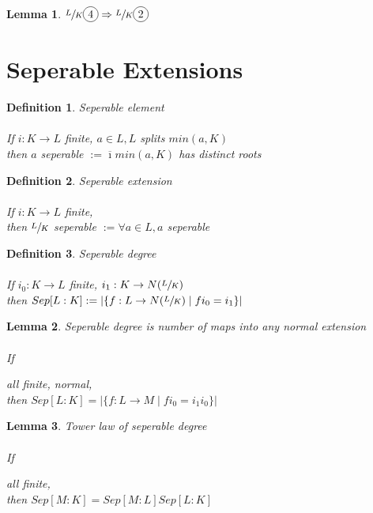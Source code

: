 \documentclass{article}
\theoremstyle{definitionstyle}
\newtheorem{defn}{Definition}[section]
\theoremstyle{lemmastyle}
\newtheorem{lem}{Lemma}[section]
\theoremstyle{remark}
\newcommand{\ibar}{\overline{\imath}}
\newcommand*\circled[1]{\tikz[baseline=(char.base)]{
            \node[shape=circle,draw,inner sep=2pt] (char) {#1};}}
\begin{document}
\begin{lem} $\sfrac{L}{K}\circled{4} \Rightarrow \sfrac{L}{K}\circled{2}$ \end{lem}

\section{Seperable Extensions}

\begin{defn} Seperable element\\
\\
If $i : K \to L$ finite, $a \in L, L$ splits $min(a,K)$\\

then $a$ seperable $:= \ibar min(a,K)$ has distinct roots\end{defn}

\begin{defn} Seperable extension\\
\\
If $i : K \to L$ finite,\\

then $\sfrac{L}{K}$ seperable $:= \forall a \in L, a$ seperable \end{defn}

\begin{defn} Seperable degree\\
\\
If $i_0 : K \to L$ finite, $i_1 : K \to N(\sfrac{L}{K})$\\

then $Sep[L : K] := |\{ f : L \to N(\sfrac{L}{K}) \mid f i_0 = i_1\}|$ \end{defn}

\begin{lem} Seperable degree is number of maps into any normal extension\\
\\
If  all finite,  normal,\\

then $Sep[L:K] = |\{ f : L \to M \mid f i_0 = i_1 i_0\}|$
\end{lem}

\begin{lem} Tower law of seperable degree\\
\\
If  all finite,\\

then $Sep[M : K] = Sep[M : L] Sep[L : K]$
\end{lem}
\end{document}
